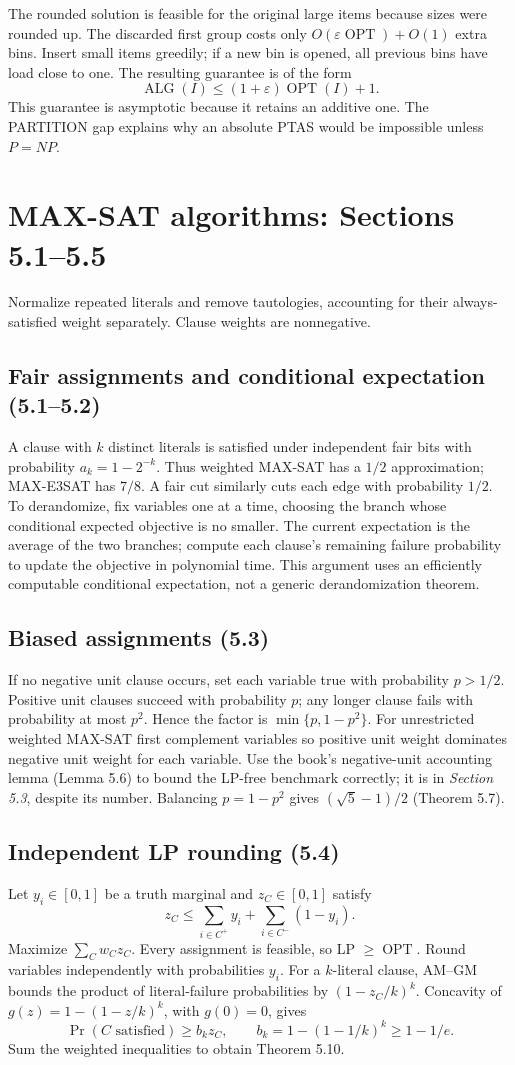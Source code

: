 \documentclass[11pt,a4paper]{article}
\newcommand{\OPT}{\operatorname{OPT}}
\newcommand{\ALG}{\operatorname{ALG}}
\newcommand{\1}{\mathbf 1}
\begin{document}
The rounded solution is feasible for the original large items because sizes were
rounded up.  The discarded first group costs only $O(\varepsilon\OPT)+O(1)$ extra bins.
Insert small items greedily; if a new bin is opened, all previous bins have load close
to one.  The resulting guarantee is of the form
\[
  \ALG(I)\leq(1+\varepsilon)\OPT(I)+1.
\]
This guarantee is asymptotic because it retains an additive one. The PARTITION gap explains why an absolute PTAS would be impossible unless $P=NP$.


\section{MAX-SAT algorithms: Sections 5.1--5.5}
Normalize repeated literals and remove tautologies, accounting for their
always-satisfied weight separately. Clause weights are nonnegative.
\subsection{Fair assignments and conditional expectation (5.1--5.2)}
A clause with $k$ distinct literals is satisfied under independent fair bits
with probability $a_k=1-2^{-k}$. Thus weighted MAX-SAT has a $1/2$ approximation;
MAX-E3SAT has $7/8$. A fair cut similarly cuts each edge with probability $1/2$.
To derandomize, fix variables one at a time, choosing the branch whose
conditional expected objective is no smaller. The current expectation is the
average of the two branches; compute each clause's remaining failure probability
to update the objective in polynomial time. This argument uses an efficiently
computable conditional expectation, not a generic derandomization theorem.
\subsection{Biased assignments (5.3)}
If no negative unit clause occurs, set each variable true with probability
$p>1/2$. Positive unit clauses succeed with probability $p$; any longer clause
fails with probability at most $p^2$. Hence the factor is
$\min\{p,1-p^2\}$. For unrestricted weighted MAX-SAT first complement variables
so positive unit weight dominates negative unit weight for each variable.
Use the book's negative-unit accounting lemma (Lemma 5.6) to bound the LP-free
benchmark correctly; it is in \emph{Section 5.3}, despite its number.
Balancing $p=1-p^2$ gives $(\sqrt5-1)/2$ (Theorem 5.7).
\subsection{Independent LP rounding (5.4)}
Let $y_i\in[0,1]$ be a truth marginal and $z_C\in[0,1]$ satisfy
\[
 z_C\le\sum_{i\in C^+}y_i+\sum_{i\in C^-}(1-y_i).
\]
Maximize $\sum_C w_Cz_C$. Every assignment is feasible, so LP $\ge\OPT$.
Round variables independently with probabilities $y_i$. For a $k$-literal clause,
AM--GM bounds the product of literal-failure probabilities by
$(1-z_C/k)^k$. Concavity of $g(z)=1-(1-z/k)^k$, with $g(0)=0$, gives
\[
 \Pr(C\text{ satisfied})\ge b_kz_C,
 \qquad b_k=1-(1-1/k)^k\ge1-1/e.
\]
Sum the weighted inequalities to obtain Theorem 5.10.
\end{document}
